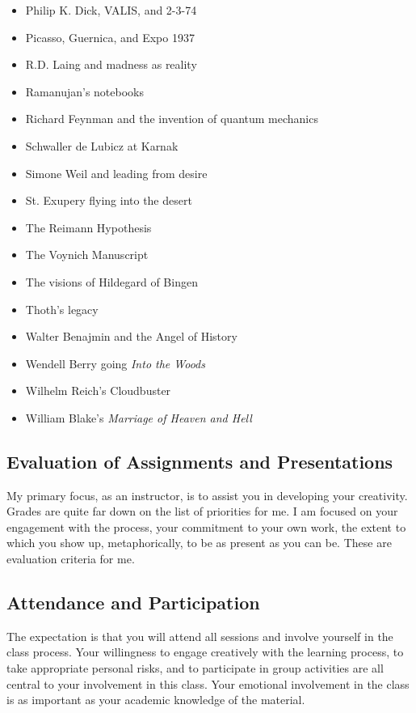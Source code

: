 \documentclass[letterpaper,10pt,headsepline]{scrreprt}
\begin{document}
\begin{itemize}
\item Philip K. Dick, VALIS, and 2-3-74
\item Picasso, Guernica, and Expo 1937
\item R.D. Laing and madness as reality
\item Ramanujan's notebooks
\item Richard Feynman and the invention of quantum mechanics
\item Schwaller de Lubicz at Karnak
\item Simone Weil and leading from desire
\item St. Exupery flying into the desert
\item The Reimann Hypothesis
\item The Voynich Manuscript
\item The visions of Hildegard of Bingen
\item Thoth's legacy
\item Walter Benajmin and the Angel of History
\item Wendell Berry going \textit{Into the Woods}
\item Wilhelm Reich's Cloudbuster
\item William Blake's \textit{Marriage of Heaven and Hell}

\end{itemize}


\subsection{Evaluation of Assignments and Presentations}
My primary focus, as an instructor, is to assist you in developing
your creativity. Grades are quite far down on the list of priorities
for me. I am focused on your engagement with the process, your
commitment to your own work, the extent to which you show up,
metaphorically, to be as present as you can be. These are evaluation
criteria for me.

\subsection{Attendance and Participation}
The expectation is that you will attend all sessions and involve
yourself in the class process. Your willingness to engage creatively
with the learning process, to take appropriate personal risks, and to
participate in group activities are all central to your involvement in
this class. Your emotional involvement in the class is
as important as your academic knowledge of the material.
\end{document}
